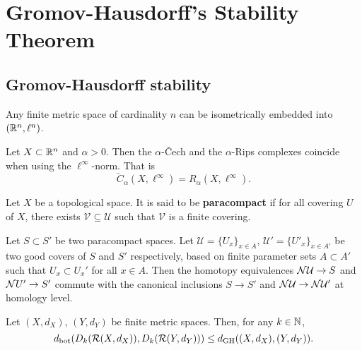 \chapter{Gromov-Hausdorff's Stability Theorem}
\section{Gromov-Hausdorff stability}
\begin{lemma}
    Any finite metric space of cardinality $ n $ can be isometrically embedded into $(\mathbb R^n, \ell^n)$.
\end{lemma}

\begin{lemma}
    Let $ X \subset \mathbb R^n $ and $ \alpha > 0 $. Then the $\alpha$-\v Cech and the $\alpha$-Rips complexes coincide when using the $ \ell^\infty $-norm. That is
    $$
        \check C_\alpha(X, \ell^\infty) = R_\alpha(X, \ell^\infty).
    $$
\end{lemma}

\begin{definition}
    Let $ X $ be a topological space. It is said to be {\bf paracompact} if for all covering $ U $ of $ X $, there exists $ \mathcal V \subseteq \mathcal U $ such that $ \mathcal V $ is a finite covering.
\end{definition}

\begin{definition}

\end{definition}

\begin{lemma}
    Let $ S \subset S' $ be two paracompact spaces. Let $ \mathcal U = \{U_x\}_{x \in A}$, $ \mathcal U' = \{U'_x\}_{x \in A'}$ be two good covers of $ S $ and $ S'$ respectively, based on finite parameter sets $ A \subset A ' $ such that $ U_x \subset U_x' $ for all $ x \in A $. Then the homotopy equivalences $ \mathcal{N} \mathcal U \to S $ and $\mathcal{N} U' \to S' $ commute with the canonical inclusions $ S \to S' $ and $ \mathcal{N} \mathcal U \to \mathcal{N} \mathcal U' $ at homology level.
\end{lemma}

\begin{theorem}
    Let $ (X, d_X) $, $ (Y, d_Y) $ be finite metric spaces. Then, for any $ k \in \mathbb N$, 
    $$
        d_{\operatorname{bot}}(D_k(\mathcal{R}(X, d_X)), D_k(\mathcal{R}(Y, d_Y))) \leq d_{\operatorname{GH}}((X, d_X), (Y, d_Y)).
    $$
\end{theorem}

